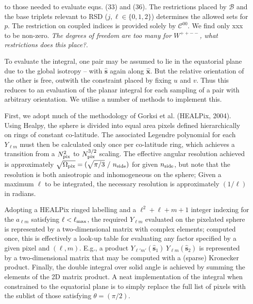 \documentclass[useAMS,usenatbib]{mn2e}
\begin{document}
to those needed to evaluate eqns. (33) and (36).  The restrictions placed by $\mathcal{B}$ and the base triplets relevant to RSD ($j, \ell \in \{ 0,1, 2 \}$) determines the allowed sets for $p$.  The restriction on coupled indices is provided solely by $\mathcal{C}^{00}$.  We find only xxx to be non-zero.  \emph{The degrees of freedom are too many for $W^{++--}$, what restrictions does this place?}.  %

To evaluate the integral, one pair may be assumed to lie in the equatorial plane due to the global isotropy -- with $\boldsymbol{\hat s}$ again along $\boldsymbol{\hat x}$. But the relative orientation of the other is free,  outwith the constraint placed by fixing $u$ and $v$.  Thus this reduces to an evaluation of the planar integral for each sampling of a pair with arbitrary orientation.  We utilise a number of methods to implement this.  

First, we adopt much of the methodology of Gorksi et al. (HEALPix, 2004).  Using Healpy, the sphere is divided into equal area pixels defined hierarchically on rings of constant co-latitude.  The associated Legendre polynomial for each $Y_{\ell m}$ must then be calculated only once per co-latitude ring, which achieves a transition from a $N_{\rm{pix}}^2$ to $N_{\rm{pix}}^{3/2}$ scaling.  The effective angular resolution achieved is approximately $\sqrt{\Omega_{\rm{pix}}} = (\sqrt{\pi / 3} \ / \ n_{\rm{side}})$ for given $n_{\rm{side}}$, but note that the resolution is both anisotropic and inhomogeneous on the sphere;  Given a maximum $\ell$ to be integrated, the necessary resolution is approximately $(1 / \ell)$ in radians.  

Adopting a HEALPix ringed labelling and a $\ell^2 + \ell + m + 1$ integer indexing for the $a_{\ell m}$ satisfying $\ell < \ell_{\rm{max}}$, the required $Y_{\ell m}$ evaluated on the pixelated sphere is represented by a two-dimensional matrix with complex elements; computed once, this is effectively a look-up table for evaluating any factor specified by a given pixel and $(\ell, m)$.  E.g., a product $Y_{\ell' m'}(\boldsymbol{\hat s}_1) \ Y_{\ell m}(\boldsymbol{\hat s}_2)$ is represented by a two-dimensional matrix that may be computed with a (sparse) Kronecker product.  Finally, the double integral over solid angle is achieved by summing the elements of the 2D matrix product.  A neat implementation of the integral when constrained to the equatorial plane is to simply replace the full list of pixels with the sublist of those satisfying $\theta = (\pi / 2)$.  
\end{document}
